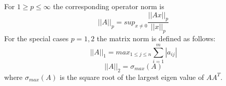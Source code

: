 \begin{enumerate}
For $ 1 \geq p \leq \infty$ the corresponding operator norm is \begin{equation} ||A||_p = sup_{x \neq 0} \frac{||Ax||_p}{||x||_p} \end{equation} 
For the special cases $ p = 1,2$ the matrix norm is defined as follows: \begin{equation}
||A||_1 = max_{1\leq j \leq n} \sum_{i =1}^{m} |a_{ij} |
\end{equation}
\begin{equation}
||A||_2 = \sigma_{max} (A) 
\end{equation} where $\sigma_{max} (A)$ is the square root of the largest eigen value of $ AA^{T} $.
\end{enumerate}    


